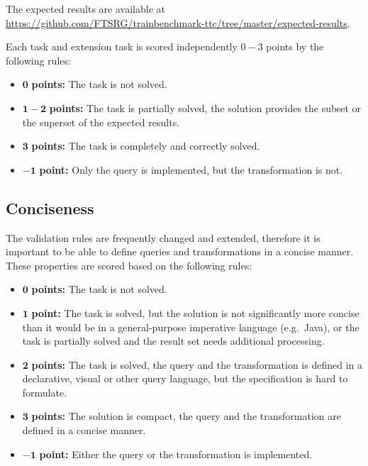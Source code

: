 \documentclass[submission,copyright,creativecommons]{eptcs}
\begin{document}
The expected results are available at \url{https://github.com/FTSRG/trainbenchmark-ttc/tree/master/expected-results}.

Each task and extension task is scored independently $0-3$ points by the following rules:
\begin{itemize}
  \item $\mathbf{0}$   \textbf{points:} The task is not solved.
  \item $\mathbf{1-2}$ \textbf{points:} The task is partially solved, the solution provides the subset or the superset of the expected results.
  \item $\mathbf{3}$   \textbf{points:} The task is completely and correctly solved.
  \item $\mathbf{-1}$  \textbf{point:} Only the query is implemented, but the transformation is not.
\end{itemize}

\noindent{}

\subsection{Conciseness}

The validation rules are frequently changed and extended, therefore it is important to be able to define queries and transformations in a concise manner. These properties are scored based on the following rules:

\begin{itemize}
  \item $\mathbf{0}$   \textbf{points:} The task is not solved.
  \item $\mathbf{1}$   \textbf{point:} The task is solved, but the solution is not significantly more concise than it would be in a general-purpose imperative language (e.g.\ Java), or the task is partially solved and the result set needs additional processing.
  \item $\mathbf{2}$   \textbf{points:} The task is solved, the query and the transformation is defined in a declarative, visual or other query language, but the specification is hard to formulate.
  \item $\mathbf{3}$   \textbf{points:} The solution is compact, the query and the transformation are defined in a concise manner.
  \item $\mathbf{-1}$  \textbf{point:} Either the query or the transformation is implemented.
\end{itemize}
\end{document}

